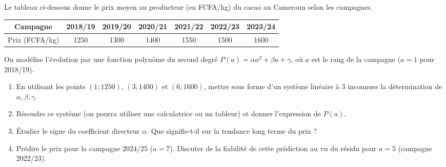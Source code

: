 \documentclass[11pt]{article}
\begin{document}
\begin{exercice}
Le tableau ci-dessous donne le prix moyen au producteur (en FCFA/kg) du cacao au Cameroun selon les campagnes.
\begin{center}
\begin{tabular}{|c|c|c|c|c|c|c|}
\hline
Campagne & 2018/19 & 2019/20 & 2020/21 & 2021/22 & 2022/23 & 2023/24 \\
\hline
Prix (FCFA/kg) & 1250 & 1300 & 1400 & 1550 & 1500 & 1600 \\
\hline
\end{tabular}
\end{center}
On modélise l'évolution par une fonction polynôme du second degré $P(a) = \alpha a^2 + \beta a + \gamma$, où $a$ est le rang de la campagne ($a=1$ pour 2018/19).
\begin{enumerate}
    \item En utilisant les points $(1; 1250)$, $(3; 1400)$ et $(6; 1600)$, mettre sous forme d'un système linéaire à 3 inconnues la détermination de $\alpha, \beta, \gamma$.
    \item Résoudre ce système (on pourra utiliser une calculatrice ou un tableur) et donner l'expression de $P(a)$.
    \item Étudier le signe du coefficient directeur $\alpha$. Que signifie-t-il sur la tendance long terme du prix ?
    \item Prédire le prix pour la campagne 2024/25 ($a=7$). Discuter de la fiabilité de cette prédiction au vu du résidu pour $a=5$ (campagne 2022/23).
\end{enumerate}
\end{exercice}
\end{document}
